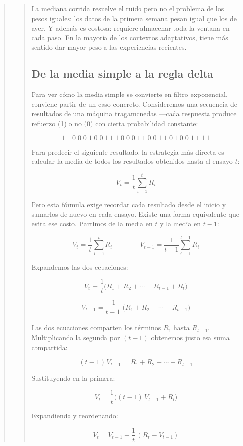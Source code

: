 \documentclass[
  letterpaper,
  DIV=11,
  numbers=noendperiod]{scrreprt}
\begin{document}
\begin{tcolorbox}[enhanced jigsaw, toprule=.15mm, arc=.35mm, colback=white, opacityback=0, colframe=quarto-callout-note-color-frame, breakable, rightrule=.15mm, left=2mm, leftrule=.75mm, bottomrule=.15mm]
\begin{quote}
\begin{quote}
La mediana corrida resuelve el ruido pero no el problema de los pesos
iguales: los datos de la primera semana pesan igual que los de ayer. Y
además es costosa: requiere almacenar toda la ventana en cada paso. En
la mayoría de los contextos adaptativos, tiene más sentido dar mayor
peso a las experiencias recientes.

\subsection{De la media simple a la regla
delta}\label{de-la-media-simple-a-la-regla-delta}

Para ver cómo la media simple se convierte en filtro exponencial,
conviene partir de un caso concreto. Consideremos una secuencia de
resultados de una máquina tragamonedas ---cada respuesta produce
refuerzo (1) o no (0) con cierta probabilidad constante:

\[1\;1\;0\;0\;0\;1\;0\;0\;1\;1\;1\;0\;0\;0\;1\;1\;0\;0\;1\;1\;0\;1\;0\;0\;1\;1\;1\;1\]

Para predecir el siguiente resultado, la estrategia más directa es
calcular la media de todos los resultados obtenidos hasta el ensayo
\(t\):

\[V_t = \frac{1}{t}\sum_{i=1}^{t} R_i\]

Pero esta fórmula exige recordar cada resultado desde el inicio y
sumarlos de nuevo en cada ensayo. Existe una forma equivalente que evita
ese costo. Partimos de la media en \(t\) y la media en \(t-1\):

\[V_t = \frac{1}{t}\sum_{i=1}^{t} R_i \qquad \qquad V_{t-1} = \frac{1}{t-1}\sum_{i=1}^{t-1} R_i\]

Expandemos las dos ecuaciones:

\[V_t = \frac{1}{t}\bigl(R_1 + R_2 + \cdots + R_{t-1} + R_t\bigr)\]

\[V_{t -1}= \frac{1}{t-1|}\bigl(R_1 + R_2 + \cdots + R_{t-1} )\]

Las dos ecuaciones comparten los términos \(R_1\) hasta \(R_{t-1}\).
Multiplicando la segunda por \((t-1)\) obtenemos justo esa suma
compartida:

\[(t-1)\,V_{t-1} = R_1 + R_2 + \cdots + R_{t-1}\]

Sustituyendo en la primera:

\[V_t = \frac{1}{t}\bigl((t-1)\,V_{t-1} + R_t\bigr)\]

Expandiendo y reordenando:

\[V_t = V_{t-1} + \frac{1}{t}\,(R_t - V_{t-1})\]


\end{quote}
\end{quote}
\end{tcolorbox}
\end{document}
